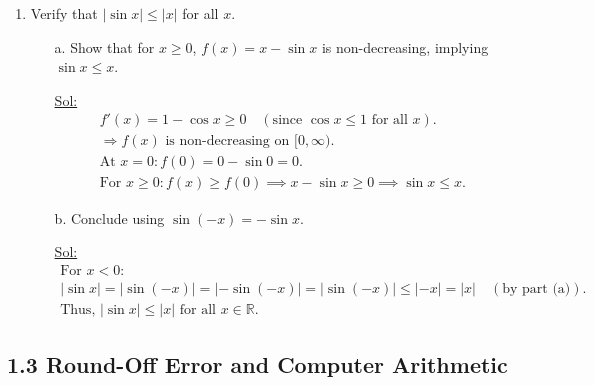 \begin{enumerate}
\item Verify that \( |\sin x| \leq |x| \) for all \( x \).
  \begin{itemize}
    \item[a.] Show that for \( x \geq 0 \), \( f(x) = x - \sin x \)
      is non-decreasing, implying \( \sin x \leq x \).

      \underline{Sol:}\\
      \[
        \begin{array}{l}
          f'(x) = 1 - \cos x \geq 0 \quad (\text{since } \cos x \leq
          1 \text{ for all } x). \\
          \Rightarrow f(x) \text{ is non-decreasing on } [0, \infty). \\
          \text{At } x = 0: f(0) = 0 - \sin 0 = 0. \\
          \text{For } x \geq 0: f(x) \geq f(0) \implies x - \sin x
          \geq 0 \implies \sin x \leq x.
        \end{array}
      \]
      \bigbreak

    \item[b.] Conclude using \( \sin(-x) = -\sin x \).

      \underline{Sol:}\\
      \[
        \begin{array}{l}
          \text{For } x < 0: \\
          |\sin x| = |\sin(-x)| = |-\sin(-x)| = |\sin(-x)| \leq |-x|
          = |x| \quad (\text{by part (a)}). \\
          \text{Thus, } |\sin x| \leq |x| \text{ for all } x \in \mathbb{R}.
        \end{array}
      \]
      \bigbreak
  \end{itemize}

\end{enumerate}

\subsection*{1.3 Round-Off Error and Computer Arithmetic}

